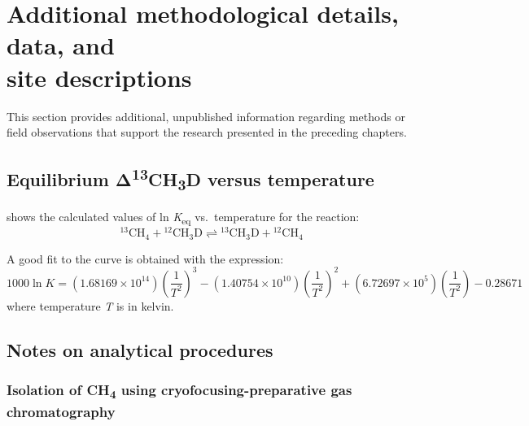 \chapter{Additional methodological details, data, and \\site
	descriptions}\label{dx:C}

This section provides additional, unpublished information regarding
methods or field observations that support the research presented in
the preceding chapters.

\section{\texorpdfstring{Equilibrium 
		Δ\textsuperscript{13}CH\textsubscript{3}D versus
		temperature}{Calculated equilibrium Δ13CH3D versus temperature}}\label{calculated-equilibrium-ux3b413ch3d-versus-temperature}

 shows the calculated values of ln \emph{K}\textsubscript{eq} vs.\ temperature for the reaction:
\begin{equation}\label{eqn:C:exchange}
{}^{13}\text{CH}_4+ {}^{12}{\text{CH}}_3\text{D}\rightleftharpoons {}^{13}{\text{CH}}_3\text{D}+ {}^{12}{\text{CH}}_4 
\end{equation}

\noindent A good fit to the curve is obtained with the expression:
\begin{equation}\label{eqn:C:equilibrium}
1000\ln K = \left( 1.68169 \times 10^{14} \right)\left( \frac{1}{T^{2}} \right)^{3} - \left( 1.40754 \times 10^{10} \right)\left( \frac{1}{T^{2}} \right)^{2} + \left( 6.72697 \times 10^{5} \right)\left( \frac{1}{T^{2}} \right) - 0.28671
\end{equation}
where temperature \emph{T} is in kelvin.



\section{Notes on analytical procedures}

\subsection{\texorpdfstring{Isolation of CH\textsubscript{4} using
		cryofocusing-preparative gas
		chromatography}{Isolation of CH4 using cryofocusing-preparative gas chromatography}}\label{isolation-of-ch4-using-cryofocusing-preparative-gas-chromatography}

